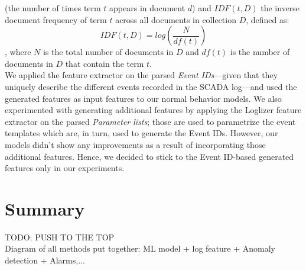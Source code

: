         (the number of times term $t$ appears in document $d$) and $IDF(t,D)$ the inverse document frequency of term $t$ across all documents in collection $D$, defined as:
        \begin{equation}
          IDF(t,D) = log(\frac{N}{df(t)})
        \end{equation}
        , where $N$ is the total number of documents in $D$ and $df(t)$ is the number of documents in $D$ that contain the term $t$.\\
        We applied the feature extractor on the parsed \emph{Event IDs}---given that they uniquely describe the different events recorded in the SCADA log---and 
        used the generated features as input features to our normal behavior models. We also experimented with generating additional features by applying the Loglizer feature extractor 
        on the parsed \emph{Parameter lists}; those are used to parametrize the event templates which are, in turn, used to generate the Event IDs. 
        However, our models didn't show any improvements as a result of incorporating those additional features. Hence, we decided to stick to the Event ID-based 
        generated features only in our experiments.



\clearpage

\section{Summary}
TODO:
PUSH TO THE TOP\\
Diagram of all methods put together: ML model + log feature + Anomaly detection + Alarms,...

\clearpage